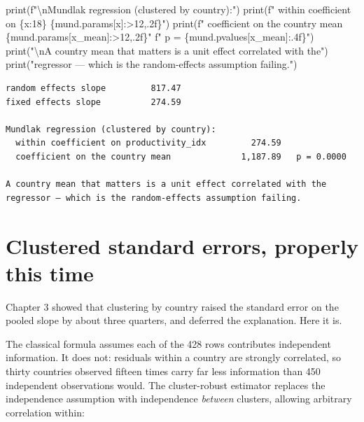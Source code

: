 \documentclass[
  letterpaper,
  10pt,
  twoside,
  openright,
  numbers=noenddot,
  chapterprefix=true]{scrbook}
\newenvironment{Shaded}{}{}
\newcommand{\BuiltInTok}[1]{\textcolor[rgb]{0.84,0.23,0.29}{#1}}
\newcommand{\CharTok}[1]{\textcolor[rgb]{0.01,0.18,0.38}{#1}}
\newcommand{\NormalTok}[1]{\textcolor[rgb]{0.14,0.16,0.18}{#1}}
\newcommand{\SpecialCharTok}[1]{\textcolor[rgb]{0.00,0.36,0.77}{#1}}
\newcommand{\SpecialStringTok}[1]{\textcolor[rgb]{0.01,0.18,0.38}{#1}}
\newcommand{\StringTok}[1]{\textcolor[rgb]{0.01,0.18,0.38}{#1}}
\begin{document}
\begin{Shaded}
\begin{Highlighting}[]
\BuiltInTok{print}\NormalTok{(}\SpecialStringTok{f"}\CharTok{\textbackslash{}n}\SpecialStringTok{Mundlak regression (clustered by country):"}\NormalTok{)}
\BuiltInTok{print}\NormalTok{(}\SpecialStringTok{f"  within coefficient on }\SpecialCharTok{\{}\NormalTok{x}\SpecialCharTok{:18\}}\SpecialStringTok{ }\SpecialCharTok{\{}\NormalTok{mund}\SpecialCharTok{.}\NormalTok{params[x]}\SpecialCharTok{:\textgreater{}12,.2f\}}\SpecialStringTok{"}\NormalTok{)}
\BuiltInTok{print}\NormalTok{(}\SpecialStringTok{f"  coefficient on the country mean          }\SpecialCharTok{\{}\NormalTok{mund}\SpecialCharTok{.}\NormalTok{params[}\StringTok{\textquotesingle{}x\_mean\textquotesingle{}}\NormalTok{]}\SpecialCharTok{:\textgreater{}12,.2f\}}\SpecialStringTok{"}
      \SpecialStringTok{f"   p = }\SpecialCharTok{\{}\NormalTok{mund}\SpecialCharTok{.}\NormalTok{pvalues[}\StringTok{\textquotesingle{}x\_mean\textquotesingle{}}\NormalTok{]}\SpecialCharTok{:.4f\}}\SpecialStringTok{"}\NormalTok{)}
\BuiltInTok{print}\NormalTok{(}\StringTok{"}\CharTok{\textbackslash{}n}\StringTok{A country mean that matters is a unit effect correlated with the"}\NormalTok{)}
\BuiltInTok{print}\NormalTok{(}\StringTok{"regressor — which is the random{-}effects assumption failing."}\NormalTok{)}
\end{Highlighting}
\end{Shaded}

\begin{verbatim}
random effects slope         817.47
fixed effects slope          274.59

Mundlak regression (clustered by country):
  within coefficient on productivity_idx         274.59
  coefficient on the country mean              1,187.89   p = 0.0000

A country mean that matters is a unit effect correlated with the
regressor — which is the random-effects assumption failing.
\end{verbatim}

\section{Clustered standard errors, properly this
time}\label{clustered-standard-errors-properly-this-time}

Chapter 3 showed that clustering by country raised the standard error on
the pooled slope by about three quarters, and deferred the explanation.
Here it is.

The classical formula assumes each of the 428 rows contributes
independent information. It does not: residuals within a country are
strongly correlated, so thirty countries observed fifteen times carry
far less information than 450 independent observations would. The
cluster-robust estimator replaces the independence assumption with
independence \emph{between} clusters, allowing arbitrary correlation
within:
\end{document}
